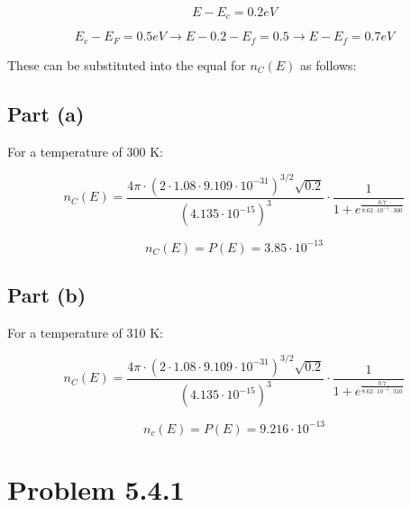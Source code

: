\documentclass[11pt]{article}
\begin{document}
\[E-E_c=0.2eV\]

\[E_c-E_F=0.5eV\rightarrow E-0.2-E_f=0.5\rightarrow E-E_f=0.7eV\]

These can be substituted into the equal for \(n_C(E)\) as follows:

\hypertarget{part-a}{%
\subsection{Part (a)}\label{part-a}}

For a temperature of 300 K:

\[n_C(E)=\frac{4\pi \cdot(2\cdot 1.08\cdot 9.109\cdot 10^{-31})^{3/2}\sqrt{0.2}}{(4.135\cdot 10^{-15})^3}\cdot \frac{1}{1+e^{\frac{0.7}{8.62\cdot 10^{-5}\cdot300}}}\]

\[n_C(E)=P(E)=3.85\cdot 10^{-13}\]

\hypertarget{part-b}{%
\subsection{Part (b)}\label{part-b}}

For a temperature of 310 K:

\[n_C(E)=\frac{4\pi  \cdot(2\cdot 1.08\cdot 9.109\cdot 10^{-31})^{3/2}\sqrt{0.2}}{(4.135\cdot 10^{-15})^3}\cdot \frac{1}{1+e^{\frac{0.7}{8.62\cdot 10^{-5}\cdot310}}}\]

\[n_c(E)=P(E)=9.216\cdot 10^{-13}\]

    \hypertarget{problem-5.4.1}{%
\section{Problem 5.4.1}\label{problem-5.4.1}}
\end{document}
